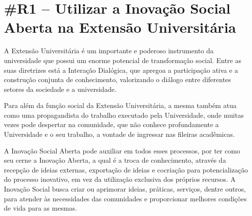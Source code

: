 \section*{\#R1 – Utilizar a Inovação Social Aberta na Extensão Universitária}

A Extensão Universitária é um importante e poderoso instrumento da universidade que possui um enorme potencial de transformação social. Entre as suas diretrizes está a Interação Dialógica, que apregoa a participação ativa e a construção conjunta de conhecimento, valorizando o diálogo entre diferentes setores da sociedade e a universidade.

Para além da função social da Extensão Universitária, a mesma também atua como uma propagandista do trabalho executado pela Universidade, onde muitas vezes pode despertar na comunidade, que não conhece profundamente a Universidade e o seu trabalho, a vontade de ingressar nas fileiras acadêmicas.

A Inovação Social Aberta pode auxiliar em todos esses processos, por ter como seu cerne a Inovação Aberta, a qual é a troca de conhecimento, através da recepção de ideias externas, exportação de ideias e cocriação para potencialização do processo inovativo, em vez da utilização exclusiva dos próprios recursos. A Inovação Social busca criar ou aprimorar ideias, práticas, serviços, dentre outros, para atender às necessidades das comunidades e proporcionar melhores condições de vida para as mesmas.